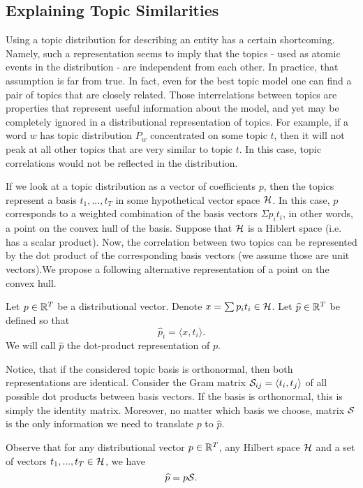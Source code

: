 \subsection{Explaining Topic Similarities}
Using a topic distribution for describing an entity has a certain
shortcoming. Namely, such a representation seems to imply that the
topics - used as atomic events in the distribution - are independent
from each other. In practice, that assumption is far from true. In
fact, even for the best topic model one can find a pair of topics that
are closely related. Those interrelations between topics are
properties that represent useful information about the model, and yet
may be completely ignored in a distributional representation of
topics. For example, if a word $w$ has topic distribution $P_w$
concentrated on some topic $t$, then it will 
not peak at all other topics that are very similar to
topic $t$. In this case, topic correlations would not be reflected in
the distribution. 

If we look at a topic distribution as a vector of coefficients $p$, then
the topics represent a basis $t_1,...,t_T$ in some hypothetical vector space ${\mathcal H}$. In
this case, $p$ corresponds to a weighted combination of the basis
vectors $\Sigma p_i t_i$, in other words, a point on the convex hull of the basis.
Suppose that ${\mathcal H}$ is a Hiblert space (i.e. has a scalar
product). Now, the correlation between two topics can be represented
by the dot product of the corresponding basis vectors (we assume those
are unit vectors).We propose a following alternative representation
of a point on the convex hull.

\bed
Let $p\in{\mathbb R}^T$ be a distributional vector. Denote $x=\sum p_i
t_i\in{\mathcal H}$. Let $\widehat{p}\in{\mathbb R}^T$ be defined so that
\[\widehat{p}_i = \langle x,t_i\rangle.\]
We will call $\widehat{p}$ the dot-product representation of $p$.
\eed

Notice, that if the considered topic basis is orthonormal, then both
representations are identical. Consider the Gram matrix
${\mathcal S}_{ij}=\langle t_i,t_j\rangle$ of all possible dot products between
basis vectors. If the basis is orthonormal, this is simply the identity
matrix. Moreover, no matter which basis we choose, matrix ${\mathcal S}$ is the
only information we need to translate $p$ to $\widehat{p}$.

\bep
Observe that for any distributional vector $p\in{\mathbb R}^T$, any Hilbert space ${\mathcal H}$ and a set of
vectors $t_1,...,t_T\in{\mathcal H}$, we have 
\[\widehat{p} = p{\mathcal S}.\]
\eep

